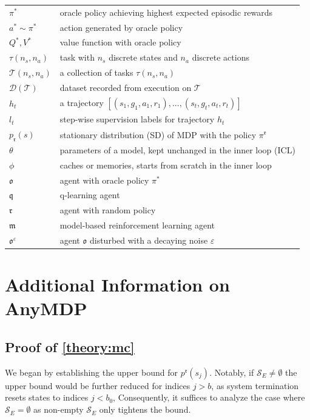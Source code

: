 \documentclass{article}
\begin{document}
\begin{table}[t]
\begin{center}
\begin{small}
\begin{sc}
\begin{tabular}{ll}
$\pi^*$ & oracle policy achieving highest expected episodic rewards \\
$a^* \sim \pi^*$ & action generated by oracle policy \\
$Q^*, V^*$ & value function with oracle policy \\
$\tau(n_s, n_a)$ & task with $n_s$ discrete states and $n_a$ discrete actions\\
$\mathcal{T}(n_s, n_a)$ & a collection of tasks $\tau(n_s, n_a)$ \\
$\mathcal{D}(\mathcal{T})$ & dataset recorded from execution on $\mathcal{T}$ \\
$h_t$ & a trajectory $[(s_1, g_1, a_1, r_1), ..., (s_t, g_t, a_t, r_t)]$ \\
$l_t$ & step-wise supervision labels for trajectory $h_t$ \\
$p_{\mathfrak{r}}(s)$ & stationary distribution (SD) of MDP with the policy $\pi^{\mathfrak{r}}$ \\
$\theta$ & parameters of a model, kept unchanged in the inner loop (ICL) \\
$\phi$ & caches or memories, starts from scratch in the inner loop \\
$\mathfrak{o}$ & agent with oracle policy $\pi^*$ \\
$\mathfrak{q}$ & q-learning agent \\
$\mathfrak{r}$ & agent with random policy \\
$\mathfrak{m}$ & model-based reinforcement learning agent \\
$\mathfrak{o}^\varepsilon$ & agent $\mathfrak{o}$ disturbed with a decaying noise $\varepsilon$ \\
\bottomrule
\end{tabular}
\end{sc}
\end{small}
\end{center}
\vskip -0.1in
\end{table}

\section{Additional Information on AnyMDP}\label{sec:add_anymdp}

\subsection{Proof of \cref{theory:mc}}

We began by establishing the upper bound for $p^\mathfrak{r}(s_j)$. Notably, if $\mathcal{S}_E \ne \emptyset$ the upper bound would be further reduced for indices $j>b$, as system termination resets states to indices $j<b_0$, Consequently, it suffices to analyze the case where $\mathcal{S}_E = \emptyset$ as non-empty $\mathcal{S}_E$ only tightens the bound. 
\end{document}
